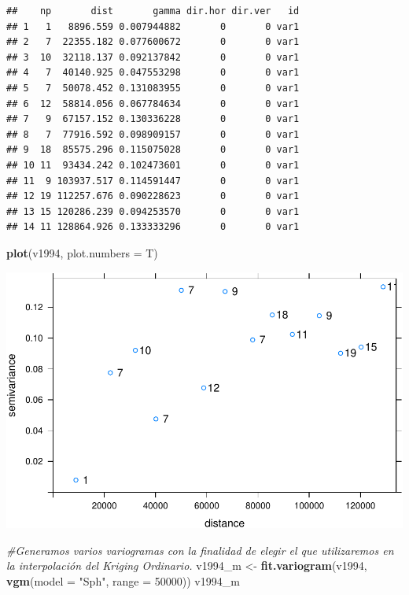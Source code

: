 \documentclass[11pt,]{article}
\newenvironment{Shaded}{\begin{snugshade}}{\end{snugshade}}
\newcommand{\KeywordTok}[1]{\textcolor[rgb]{0.13,0.29,0.53}{\textbf{#1}}}
\newcommand{\DataTypeTok}[1]{\textcolor[rgb]{0.13,0.29,0.53}{#1}}
\newcommand{\DecValTok}[1]{\textcolor[rgb]{0.00,0.00,0.81}{#1}}
\newcommand{\StringTok}[1]{\textcolor[rgb]{0.31,0.60,0.02}{#1}}
\newcommand{\CommentTok}[1]{\textcolor[rgb]{0.56,0.35,0.01}{\textit{#1}}}
\newcommand{\NormalTok}[1]{#1}
\begin{document}
\begin{verbatim}
##    np       dist       gamma dir.hor dir.ver   id
## 1   1   8896.559 0.007944882       0       0 var1
## 2   7  22355.182 0.077600672       0       0 var1
## 3  10  32118.137 0.092137842       0       0 var1
## 4   7  40140.925 0.047553298       0       0 var1
## 5   7  50078.452 0.131083955       0       0 var1
## 6  12  58814.056 0.067784634       0       0 var1
## 7   9  67157.152 0.130336228       0       0 var1
## 8   7  77916.592 0.098909157       0       0 var1
## 9  18  85575.296 0.115075028       0       0 var1
## 10 11  93434.242 0.102473601       0       0 var1
## 11  9 103937.517 0.114591447       0       0 var1
## 12 19 112257.676 0.090228623       0       0 var1
## 13 15 120286.239 0.094253570       0       0 var1
## 14 11 128864.926 0.133333296       0       0 var1
\end{verbatim}

\begin{Shaded}
\begin{Highlighting}[]
\KeywordTok{plot}\NormalTok{(v1994, }\DataTypeTok{plot.numbers =}\NormalTok{ T)}
\end{Highlighting}
\end{Shaded}

\includegraphics{proyecto_files/figure-latex/unnamed-chunk-4-5.pdf}

\begin{Shaded}
\begin{Highlighting}[]
\CommentTok{#Generamos varios variogramas con la finalidad de elegir el que utilizaremos en la interpolación del Kriging Ordinario.}
\NormalTok{v1994_m <-}\StringTok{ }\KeywordTok{fit.variogram}\NormalTok{(v1994, }\KeywordTok{vgm}\NormalTok{(}\DataTypeTok{model =} \StringTok{"Sph"}\NormalTok{, }\DataTypeTok{range =} \DecValTok{50000}\NormalTok{))}
\NormalTok{v1994_m}
\end{Highlighting}
\end{Shaded}
\end{document}
